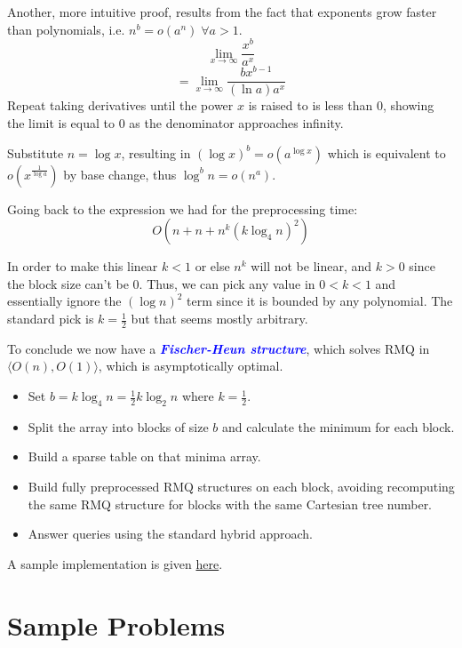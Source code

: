 \documentclass[11pt, oneside]{article}
\newcommand{\emphasis}[1]{\textcolor{blue}{\textbf{\textit{#1}}}}
\begin{document}
Another, more intuitive proof, results from the fact that exponents grow faster than polynomials,
i.e. \( n^b = o(a^n) \; \forall a > 1\).
\[ \lim_{x \to \infty} \frac{x^b}{a^x} \]
\[ = \lim_{x \to \infty} \frac{bx^{b - 1}}{(\ln a) a^x} \]
Repeat taking derivatives until the power \( x \) is raised to is less than 0,
showing the limit is equal to 0 as the denominator approaches infinity.

Substitute \( n = \log x \), resulting in \( (\log x)^b = o(a^{\log x}) \)
which is equivalent to \( o(x^{\frac{1}{\log a}}) \) by base change,
thus \( \log^b n = o(n^a) \).

Going back to the expression we had for the preprocessing time:
\[ O(n + n + n^k (k \log_4 n)^2) \]

In order to make this linear \( k < 1 \) or else \( n^k \) will not be linear,
and \( k > 0 \) since the block size can't be 0. Thus, we can pick any value in
\( 0 < k < 1 \) and essentially ignore the \( (\log n)^2 \) term since it is bounded
by any polynomial. The standard pick is \( k = \frac{1}{2} \) but that seems mostly arbitrary.

To conclude we now have a \emphasis{Fischer-Heun structure}, which solves RMQ
in \( \langle O(n), O(1) \rangle \), which is asymptotically optimal.

\begin{itemize}
  \item Set \( b = k \log_4 n = \frac{1}{2} k \log_2 n \) where \( k = \frac{1}{2} \).
  \item Split the array into blocks of size \( b \) and calculate the minimum for each block.
  \item Build a sparse table on that minima array.
  \item Build fully preprocessed RMQ structures on each block, avoiding recomputing the
  same RMQ structure for blocks with the same Cartesian tree number.
  \item Answer queries using the standard hybrid approach.
\end{itemize}

A sample implementation is given \href{https://gist.github.com/stephen-huan/aa609965c86d750736398c28b025f9be#range-minimum-query}{here}.

\section{Sample Problems}
\end{document}
